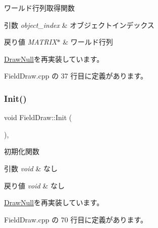 ワールド行列取得関数 


\begin{DoxyParams}{引数}
{\em object\+\_\+index} & オブジェクトインデックス \\
\hline
\end{DoxyParams}

\begin{DoxyRetVals}{戻り値}
{\em M\+A\+T\+R\+I\+X$\ast$} & ワールド行列 \\
\hline
\end{DoxyRetVals}


\mbox{\hyperlink{class_draw_null_a9aac059eb3b5d1f77e8bd3aa0647cff9}{Draw\+Null}}を再実装しています。



 Field\+Draw.\+cpp の 37 行目に定義があります。

\mbox{\label{class_field_draw_a4287d2ce33033b2413c1d3a81b173373}} 
\subsubsection{\texorpdfstring{Init()}{Init()}}
{\footnotesize\ttfamily void Field\+Draw\+::\+Init (\begin{DoxyParamCaption}{ }\end{DoxyParamCaption})\hspace{0.3cm}{\ttfamily [override]}, {\ttfamily [virtual]}}



初期化関数 


\begin{DoxyParams}{引数}
{\em void} & なし \\
\hline
\end{DoxyParams}

\begin{DoxyRetVals}{戻り値}
{\em void} & なし \\
\hline
\end{DoxyRetVals}


\mbox{\hyperlink{class_draw_null_a20aef1e54c1a158b741bfd731e18efdf}{Draw\+Null}}を再実装しています。



 Field\+Draw.\+cpp の 70 行目に定義があります。

\mbox{\label{class_field_draw_a89a78212c141714d9e39e25e663aaeff}} 

